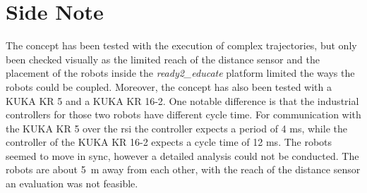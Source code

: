 \section*{Side Note}
The concept has been tested with the execution of complex trajectories, but only been checked visually as the limited reach of the distance sensor and the placement of the robots inside the \textit{ready2\_educate} platform limited the ways the robots could be coupled.\newline
Moreover, the concept has also been tested with a KUKA KR 5 and a KUKA KR 16-2. One notable difference is that the industrial controllers for those two robots have different cycle time. For communication with the KUKA KR 5 over the \gls{rsi} the controller expects a period of 4 \si{\milli\second}, while the controller of the KUKA KR 16-2 expects a cycle time of 12 \si{\milli\second}. The robots seemed to move in sync, however a detailed analysis could not be conducted. The robots are about 5 m away from each other, with the reach of the distance sensor an evaluation was not feasible. 